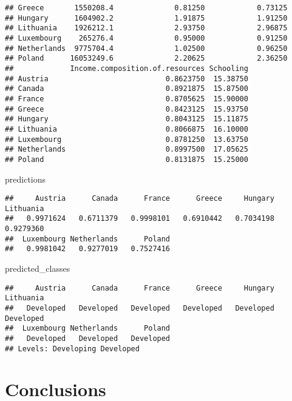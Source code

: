 \documentclass[
]{article}
\newenvironment{Shaded}{\begin{snugshade}}{\end{snugshade}}
\newcommand{\NormalTok}[1]{#1}
\begin{document}
\begin{verbatim}
## Greece       1550208.4              0.81250            0.73125
## Hungary      1604902.2              1.91875            1.91250
## Lithuania    1926212.1              2.93750            2.96875
## Luxembourg    265276.4              0.95000            0.91250
## Netherlands  9775704.4              1.02500            0.96250
## Poland      16053249.6              2.20625            2.36250
##             Income.composition.of.resources Schooling
## Austria                           0.8623750  15.38750
## Canada                            0.8921875  15.87500
## France                            0.8705625  15.90000
## Greece                            0.8423125  15.93750
## Hungary                           0.8043125  15.11875
## Lithuania                         0.8066875  16.10000
## Luxembourg                        0.8781250  13.63750
## Netherlands                       0.8997500  17.05625
## Poland                            0.8131875  15.25000
\end{verbatim}

\begin{Shaded}
\begin{Highlighting}[]
\NormalTok{predictions}
\end{Highlighting}
\end{Shaded}

\begin{verbatim}
##     Austria      Canada      France      Greece     Hungary   Lithuania 
##   0.9971624   0.6711379   0.9998101   0.6910442   0.7034198   0.9279360 
##  Luxembourg Netherlands      Poland 
##   0.9981042   0.9277019   0.7527416
\end{verbatim}

\begin{Shaded}
\begin{Highlighting}[]
\NormalTok{predicted\_classes}
\end{Highlighting}
\end{Shaded}

\begin{verbatim}
##     Austria      Canada      France      Greece     Hungary   Lithuania 
##   Developed   Developed   Developed   Developed   Developed   Developed 
##  Luxembourg Netherlands      Poland 
##   Developed   Developed   Developed 
## Levels: Developing Developed
\end{verbatim}

\section{Conclusions}\label{conclusions}
\end{document}
